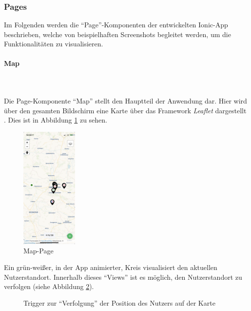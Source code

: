 \documentclass[a4paper, 11pt, DIV=11, listof=numbered, numbers=noenddot]{scrartcl}
\begin{document}
	\subsubsection{Pages}
	Im Folgenden werden die \enquote{Page}-Komponenten der entwickelten Ionic-App beschrieben, welche von beispielhaften Screenshots begleitet werden, um die Funktionalitäten zu visualisieren.
	
	\paragraph{Map}
	\textbf{}\\
	\textbf{}\\
	Die Page-Komponente \enquote{Map} stellt den Hauptteil der Anwendung dar.
	Hier wird über den gesamten Bildschirm eine Karte über das Framework \textit{Leaflet} dargestellt \cite{@Leaflet}.
	Dies ist in Abbildung \ref{fig:app-map} zu sehen.
	\begin{figure}[!htbp]
		\centering
		\includegraphics[width=0.25\textwidth]{img/app/map.png}
		\caption{Map-Page}\label{fig:app-map}
	\end{figure}
	Ein grün-weißer, in der App animierter, Kreis visualisiert den aktuellen Nutzerstandort. Innerhalb dieses \enquote{Views} ist es möglich, den Nutzerstandort zu verfolgen (siehe Abbildung \ref{fig:app-map-track-user}).
	\begin{figure}[!htbp]
		\centering
		\hfill%
		\hfill%
		\caption{Trigger zur \enquote{Verfolgung} der Position des Nutzers auf der Karte}\label{fig:app-map-track-user}
	\end{figure}
\end{document}
